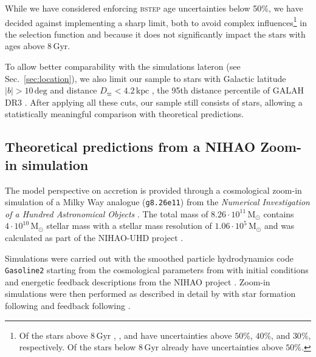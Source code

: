 \documentclass[fleqn,usenatbib]{mnras}
\begin{document}
While we have considered enforcing \textsc{bstep} age uncertainties below 50\%, we have decided against implementing a sharp limit, both to avoid complex influences\footnote{Of the  stars above $8\,\mathrm{Gyr}$ , , and  have uncertainties above $50\%$, $40\%$, and $30\%$, respectively. Of the  stars below $8\,\mathrm{Gyr}$ already  have uncertainties above $50\%$.} in the selection function and because it does not significantly impact the stars with ages above $8\,\mathrm{Gyr}$.

To allow better comparability with the simulations lateron (see Sec.~\ref{sec:location}), we also limit our sample to stars with Galactic latitude $\vert b \vert > 10\,\mathrm{deg}$ and distance $D_\varpi < 4.2\,\mathrm{kpc}$ \citep[based on photogeometric distances from][]{BailerJones2021}, the 95th distance percentile of GALAH DR3 \citep{Buder2021}. After applying all these cuts, our sample still consists of stars, allowing a statistically meaningful comparison with theoretical predictions.

\subsection{Theoretical predictions from a NIHAO Zoom-in simulation}\label{sec:sim_data}

The model perspective on accretion is provided through a cosmological zoom-in simulation of a Milky Way analogue (\texttt{g8.26e11}) from the \textit{Numerical Investigation of a Hundred Astronomical Objects} \citep[NIHAO,][]{Wang2015}. The total mass of $8.26 \cdot 10^{11}\,\mathrm{M_\odot}$ contains $4 \cdot 10^{10}\,\mathrm{M_\odot}$ stellar mass with a stellar mass resolution of $1.06 \cdot 10^{5}\,\mathrm{M_\odot}$ \citep{Buck2021} and was calculated as part of the NIHAO-UHD project \citep{Buck2020b}.

Simulations were carried out with the smoothed particle hydrodynamics code \texttt{Gasoline2} \citep{Wadsley2017} starting from the cosmological parameters from \citet{Planck2014} with initial conditions and energetic feedback descriptions from the NIHAO project \citep{Wang2015}. Zoom-in simulations were then performed as described in detail by \citet{Buck2021} with star formation following \citet{Stinson2006} and feedback following \citet{Stinson2013}.
\end{document}
